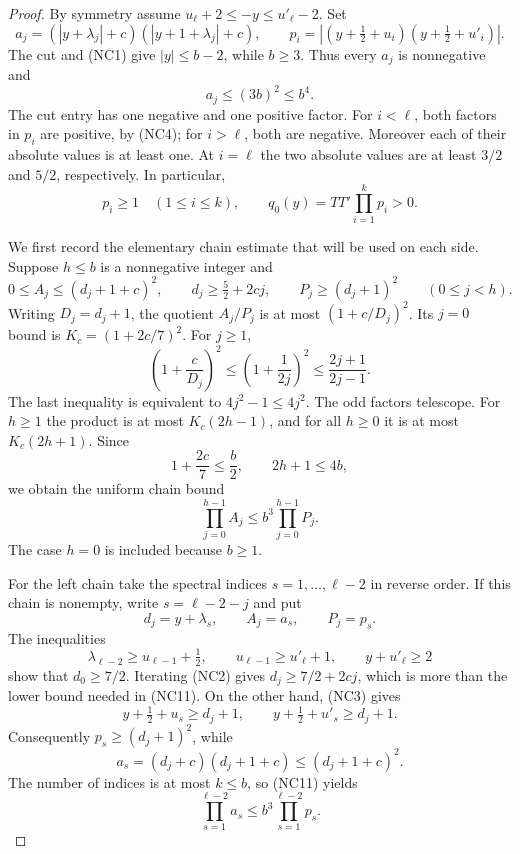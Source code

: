 \begin{proof}
By symmetry assume \(u_\ell+2\le-y\le u'_\ell-2\).
Set
\[
 a_j=(|y+\lambda_j|+c)(|y+1+\lambda_j|+c),\qquad
 p_i=|(y+\tfrac12+u_i)(y+\tfrac12+u'_i)|.
                                                        \tag{NC7}
\]
The cut and (NC1) give \(|y|\le b-2\), while \(b\ge3\).
Thus every \(a_j\) is nonnegative and
\[
 a_j\le(3b)^2\le b^4.                                  \tag{NC8}
\]
The cut entry has one negative and one positive factor.
For \(i<\ell\), both factors in \(p_i\) are positive,
by (NC4); for \(i>\ell\), both are negative.
Moreover each of their absolute values is at least one.
At \(i=\ell\) the two absolute values are at least
\(3/2\) and \(5/2\), respectively. In particular,
\[
 p_i\ge1\quad(1\le i\le k),\qquad
              q_0(y)=TT'\prod_{i=1}^kp_i>0.             \tag{NC9}
\]

We first record the elementary chain estimate that will be used
on each side. Suppose \(h\le b\) is a nonnegative integer and
\[
 0\le A_j\le(d_j+1+c)^2,\qquad
 d_j\ge\tfrac52+2cj,\qquad
 P_j\ge(d_j+1)^2
       \qquad(0\le j<h).
\]
Writing \(D_j=d_j+1\), the quotient \(A_j/P_j\) is at most
\((1+c/D_j)^2\). Its \(j=0\) bound is
\(K_c=(1+2c/7)^2\). For \(j\ge1\),
\[
 \left(1+\frac{c}{D_j}\right)^2
 \le\left(1+\frac1{2j}\right)^2
 \le\frac{2j+1}{2j-1}.
                                                        \tag{NC10}
\]
The last inequality is equivalent to \(4j^2-1\le4j^2\).
The odd factors telescope. For \(h\ge1\) the product is
at most \(K_c(2h-1)\), and for all \(h\ge0\) it is at most
\(K_c(2h+1)\). Since
\[
 1+\frac{2c}{7}\le\frac b2,\qquad 2h+1\le4b,
\]
we obtain the uniform chain bound
\[
                 \prod_{j=0}^{h-1}A_j
                         \le b^3\prod_{j=0}^{h-1}P_j .
                                                        \tag{NC11}
\]
The case \(h=0\) is included because \(b\ge1\).

For the left chain take the spectral indices
\(s=1,\ldots,\ell-2\) in reverse order. If this chain is
nonempty, write \(s=\ell-2-j\) and put
\[
        d_j=y+\lambda_s,\qquad A_j=a_s,\qquad P_j=p_s .
\]
The inequalities
\[
 \lambda_{\ell-2}\ge u_{\ell-1}+\tfrac12,\qquad
 u_{\ell-1}\ge u'_\ell+1,\qquad y+u'_\ell\ge2
\]
show that \(d_0\ge7/2\). Iterating (NC2) gives
\(d_j\ge7/2+2cj\), which is more than the lower bound
needed in (NC11). On the other hand, (NC3) gives
\[
 y+\tfrac12+u_s\ge d_j+1,\qquad
 y+\tfrac12+u'_s\ge d_j+1.
\]
Consequently \(p_s\ge(d_j+1)^2\), while
\[
 a_s=(d_j+c)(d_j+1+c)\le(d_j+1+c)^2.
\]
The number of indices is at most \(k\le b\), so (NC11) yields
\[
       \prod_{s=1}^{\ell-2}a_s
                          \le b^3\prod_{s=1}^{\ell-2}p_s.
                                                        \tag{NC12}
\]


\end{proof}

